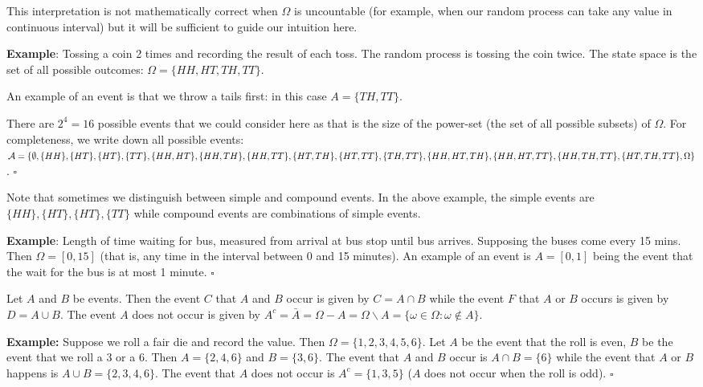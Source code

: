\documentclass[11pt]{article}
\newcommand{\sqend}{\hfill $\square$}
\begin{document}
 This interpretation is not mathematically correct when $\Omega $ is uncountable (for example, when our random process can take any value in continuous interval) but it will be sufficient to guide our intuition here.  

{\bf Example}: Tossing a coin 2 times and recording the result of each toss.  The random process is tossing the coin twice.  The state space is the set of all possible outcomes:  $\Omega = \{HH, HT, TH,TT\}$.  

An example of an event is that we throw a tails first: in this case  $A = \{TH, TT\}$.   

There are $2^4 = 16$ possible events that we could consider here as that is the size of the power-set (the set of all possible subsets) of $\Omega$.  For completeness, we write down all possible events:  $\mathcal A = \{ \emptyset, \{ HH\}, \{HT \},  \{ HT\}, \{  TT \}, \linebreak[2] \{ HH, HT \}, \{ HH, TH\}, \{ HH, TT\},   \linebreak[2]  \{ HT,TH\},  \{ HT,TT\}, \{ TH,TT\}, \{HH, HT, TH \}, \{HH, HT,TT \},  \{HH, TH,TT \}, \linebreak[3] \{HT, TH,TT \},   \linebreak[2] \Omega \}$. \sqend

Note that sometimes we distinguish between simple and compound events.  In the above example, the simple events are  $ \{ HH\}, \{HT \}, \{ HT\}, \{  TT \} $ while compound events are combinations of simple events.  


{\bf Example}: Length of time waiting for bus, measured from arrival at bus stop until bus arrives.  Supposing the buses come every 15 mins.  Then $\Omega = [0,15]$ (that is, any time in the interval between 0 and 15 minutes).   An example of an event is $A = [0,1]$ being the event  that the wait for the bus is at most 1 minute. \sqend


Let  $A$ and $B$ be events. Then the event $C$ that $A$ and $B$ occur is given by $C = A \cap B$ while the event $F$ that $A$ or $B$ occurs is given by $D = A \cup B$.  The event $A$ does not occur is given by $A^c = \bar A = \Omega - A = \Omega \backslash A = \{ \omega \in \Omega : \omega \notin A \}$. 

{\bf Example:} Suppose we roll a fair die and record the value.  Then $\Omega = \{1,2,3,4,5,6\}$.  Let $A$ be the event that the roll is even, $B$ be the event that we roll a 3 or a 6.  Then $A = \{2,4,6 \}$ and $B = \{ 3, 6 \}$.  The event that $A$ and $B$ occur is $A \cap B = \{ 6 \}$ while the event that $A$ or $B$ happens is $A \cup B = \{ 2,3,4,6 \}$.  The event that $A$ does not occur is $A^c = \{ 1,3,5 \}$ ($A$ does not occur when the roll is odd). \sqend
\end{document}
